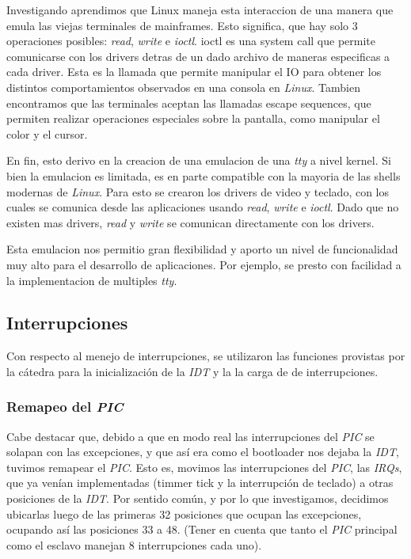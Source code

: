 \documentclass[a4paper,10pt]{article}
\begin{document}
    Investigando aprendimos que Linux maneja esta interaccion de una manera que emula las viejas terminales de mainframes.
    Esto significa, que hay solo 3 operaciones posibles: \textit{read}, \textit{write} e \textit{ioctl}.
    ioctl es una system call que permite comunicarse con los drivers detras de un dado archivo de maneras especificas a cada driver.
    Esta es la llamada que permite manipular el IO para obtener los distintos comportamientos observados en una consola en \textit{Linux}.
    Tambien encontramos que las terminales aceptan las llamadas escape sequences, que permiten realizar operaciones especiales sobre la pantalla, como manipular el color y el cursor.

    En fin, esto derivo en la creacion de una emulacion de una \textit{tty} a nivel kernel.
    Si bien la emulacion es limitada, es en parte compatible con la mayoria de las shells modernas de \textit{Linux}.
    Para esto se crearon los drivers de video y teclado, con los cuales se comunica desde las aplicaciones usando \textit{read}, \textit{write} e \textit{ioctl}.
    Dado que no existen mas drivers, \textit{read} y \textit{write} se comunican directamente con los drivers.

    Esta emulacion nos permitio gran flexibilidad y aporto un nivel de funcionalidad muy alto para el desarrollo de aplicaciones.
    Por ejemplo, se presto con facilidad a la implementacion de multiples \textit{tty}.

    \subsection{Interrupciones}
        Con respecto al menejo de interrupciones, se utilizaron las funciones provistas por la cátedra para la inicialización de la \textit{IDT} y la
        la carga de de interrupciones.

        \subsubsection{Remapeo del \textit{PIC}}
            Cabe destacar que, debido a que en modo real las interrupciones del \textit{PIC} se solapan con las excepciones, y que así era como el bootloader
            nos dejaba la \textit{IDT}, tuvimos remapear el \textit{PIC}. Esto es, movimos las interrupciones del \textit{PIC}, las \textit{IRQs}, que ya venían implementadas 
            (timmer tick y la interrupción de teclado) a otras posiciones de la \textit{IDT}. Por sentido común, y por lo que investigamos, decidimos
            ubicarlas luego de las primeras 32 posiciones que ocupan las excepciones, ocupando así las posiciones 33 a 48. (Tener en cuenta
            que tanto el \textit{PIC} principal como el esclavo manejan 8 interrupciones cada uno).
        
\end{document}
